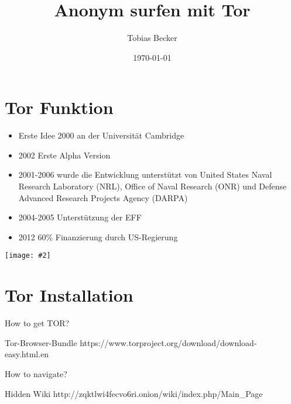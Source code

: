 \documentclass{beamer}
\title{Anonym surfen mit Tor}
\author{Tobias Becker}
\date{\today}
\newlength{\myx} %
\newlength{\myy} %
\newcommand\includegraphicstotab[2][\relax]{%
\settowidth{\myx}{\texttt{[image: \#2]}}%
\settoheight{\myy}{\texttt{[image: \#2]}}%
\parbox[c][1.1\myy][c]{\myx}{%
\texttt{[image: \#2]}}%
}%
\begin{document}
\maketitle

\section{Tor Funktion}
\begin{frame}
\begin{itemize}
\item Erste Idee 2000 an der Universität Cambridge
\item 2002 Erste Alpha Version
\item 2001-2006 wurde die Entwicklung unterstützt von United States Naval Research Laboratory (NRL), Office of Naval Research (ONR) und Defense Advanced Research Projects Agency (DARPA)
\item 2004-2005 Unterstützung der EFF
\item 2012 60\% Finanzierung durch US-Regierung
\end{itemize}
\end{frame}
\begin{frame}
\includegraphicstotab[width=1.0\linewidth]{Bilder/TOR.png}
\end{frame}

\section{Tor Installation}
\begin{frame}{How to get TOR?}
\begin{block}{Tor-Browser-Bundle}
https://www.torproject.org/download/download-easy.html.en
\end{block}
\end{frame}
\begin{frame}{How to navigate?}
\begin{block}{Hidden Wiki}
http://zqktlwi4fecvo6ri.onion/wiki/index.php/Main\_Page
\end{block}
\end{frame}
\end{document}
